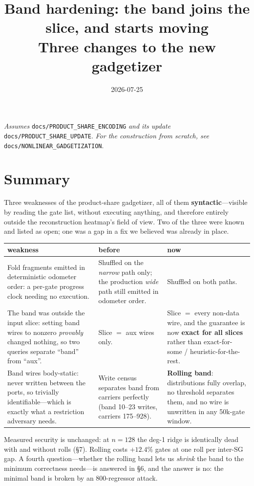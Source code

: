 \documentclass[11pt]{article}
\title{\textbf{Band hardening: the band joins the slice, and starts moving}\\[2pt]
\large Three changes to the new gadgetizer}
\author{}
\date{2026-07-25}
\begin{document}
\maketitle

\noindent\emph{Assumes} \texttt{docs/PRODUCT\_SHARE\_ENCODING} \emph{and its
update} \texttt{docs/PRODUCT\_SHARE\_UPDATE}. \emph{For the construction from
scratch, see} \texttt{docs/NONLINEAR\_GADGETIZATION}.

\section{Summary}

Three weaknesses of the product-share gadgetizer, all of them
\textbf{syntactic}---visible by reading the gate list, without executing
anything, and therefore entirely outside the reconstruction heatmap's field of
view. Two of the three were known and listed as open; one was a gap in a fix we
believed was already in place.

\begin{center}
\begin{tabular}{p{}p{}p{}}
\toprule
weakness & before & now \\
\midrule
Fold fragments emitted in deterministic odometer order: a per-gate progress
clock needing no execution.
& Shuffled on the \emph{narrow} path only; the production \emph{wide} path
still emitted in odometer order.
& Shuffled on both paths. \\[4pt]
The band was outside the input slice: setting band wires to nonzero
\emph{provably} changed nothing, so two queries separate ``band'' from ``aux''.
& Slice $=$ aux wires only.
& Slice $=$ every non-data wire, and the guarantee is now \textbf{exact for all
slices} rather than exact-for-some / heuristic-for-the-rest. \\[4pt]
Band wires body-static: never written between the ports, so trivially
identifiable---which is exactly what a restriction adversary needs.
& Write census separates band from carriers perfectly (band 10--23 writes,
carriers 175--928).
& \textbf{Rolling band}: distributions fully overlap, no threshold separates
them, and no wire is unwritten in any 50k-gate window. \\
\bottomrule
\end{tabular}
\end{center}

Measured security is unchanged: at $n{=}128$ the deg-1 ridge is identically dead
with and without rolls (\S7). Rolling costs $+12.4\%$ gates at one roll per
inter-SG gap. A fourth question---whether the rolling band lets us \emph{shrink}
the band to the minimum correctness needs---is answered in \S6, and the answer
is no: the minimal band is broken by an 800-regressor attack.
\end{document}

